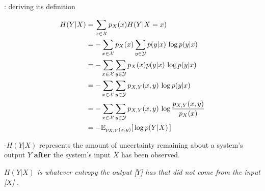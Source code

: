 \begin{frame}{\subsecname: deriving its definition}

\begin{align}
H(Y|X) 
&= \sum_{x \in \mathcal{X}} p_X(x) H(Y|X=x) \\
&= -\sum_{x \in \mathcal{X}} p_X(x) \sum_{y \in \mathcal{Y}} p(y|x)\,\log p(y|x) \\
&= -\sum_{x \in \mathcal{X}} \sum_{y \in \mathcal{Y}} p_X(x) p(y|x)\,\log p(y|x) \\
&= -\sum_{x \in \mathcal{X}} \sum_{y \in \mathcal{Y}} p_{X,Y}(x,y)\,\log p(y|x) \\
&= -\sum_{x \in \mathcal{X}} \sum_{y \in \mathcal{Y}} p_{X,Y}(x,y)\,\log \frac{p_{X,Y}(x,y)}{p_X(x)} \\
&= -\mathbb{E}_{p_{X,Y}(x,y)} \lbrack \, \log p(Y|X) \, \rbrack
\end{align}

\end{frame}

\begin{frame}{\subsecname}


-$H(Y|X)$ represents the amount of uncertainty remaining about a system's output $Y$ \textbf{after} the 
system's input $X$ has been observed.

\pause


\pause

\emph{
$H(Y|X)$ is whatever entropy the output [$Y$] has that did not come from the input [$X$]
}
.



\end{frame}

